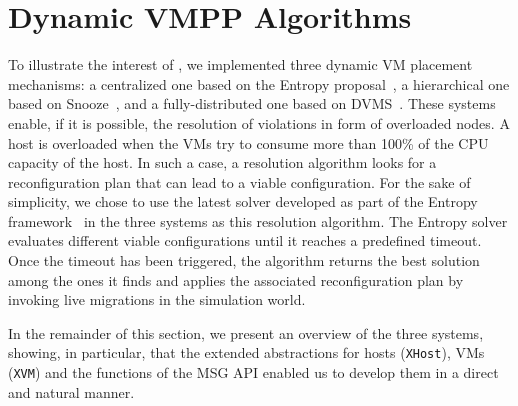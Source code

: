 \vspace*{-.15cm}
\section{Dynamic VMPP Algorithms}
\label{sec:vm-schedulers}
\vspace*{-.15cm}

To illustrate the interest of \vmps, we implemented three dynamic VM
placement mechanisms: a centralized one based on the Entropy
proposal~\cite{Hermenier:2009:ECM:1508293.1508300}, a hierarchical one
based on Snooze~\cite{feller:ccgrid12}, and a fully-distributed one
based on DVMS~\cite{quesnel:cpe2012}.
%
These systems enable, if it is possible,  the resolution  of violations in form of
overloaded nodes. A host is overloaded when the VMs try to consume
more than 100\% of the CPU capacity of the host. In such a case, a
resolution algorithm looks for a reconfiguration plan that can lead to
a viable configuration. For the sake of
simplicity, we chose to use the latest solver developed as part of the Entropy
framework~\cite{hermenier:cp11} in the three systems as this resolution algorithm.
The Entropy solver evaluates different viable configurations until  it
reaches a predefined timeout.
Once the timeout has been triggered, the algorithm returns the best
solution among the ones it finds and applies the associated
reconfiguration plan by invoking live migrations in the simulation
world.
%
%


In the remainder of this section, we present an overview of the
three systems, showing, in particular, that the extended abstractions
for hosts (\texttt{XHost}), VMs (\texttt{XVM}) and the functions of
the \sg MSG API enabled us to develop them in a direct and natural
manner.

